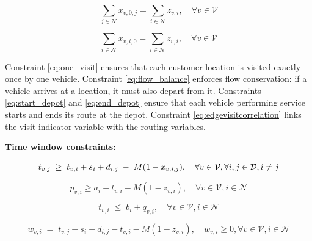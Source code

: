 
\begin{equation}\label{eq:start_depot}
\sum_{j \in \mathcal{N}} x_{v,0,j} = \sum_{i \in \mathcal{N}} z_{v,i}, \quad \forall v \in \mathcal{V}
\end{equation}

\begin{equation}\label{eq:end_depot}
\sum_{i \in \mathcal{N}} x_{v,i,0} = \sum_{i \in \mathcal{N}} z_{v,i}, \quad \forall v \in \mathcal{V}
\end{equation}


Constraint \ref{eq:one_visit} ensures that each customer location is visited exactly once by one vehicle. Constraint \ref{eq:flow_balance} enforces flow conservation: if a vehicle arrives at a location, it must also depart from it. Constraints \eqref{eq:start_depot} and \eqref{eq:end_depot} ensure that each vehicle performing service starts and ends its route at the depot.
Constraint \ref{eq:edgevisitcorrelation} links the visit indicator variable with the routing variables.

\textbf{Time window constraints:}

\scriptsize
\begin{equation}{\label{eq:time_cohestion}}
 t_{v,j} \;\ge\; t_{v,i} + s_i + d_{i,j} \;-\; M(1 - x_{v,i,j}), \quad \forall v \in \mathcal{V}, \forall i,j \in \mathcal{D}, i\neq j
\end{equation}

\begin{equation}\label{eq:start_soft}
p_{v,i} \geq a_i - t_{v,i}-M(1-z_{v,i}), \quad \forall v \in \mathcal{V}, i \in \mathcal{N}
\end{equation}

\begin{equation}\label{eq:penalty}
t_{v,i} \;\le\; b_i + q_{v,i}, \quad \forall v \in \mathcal{V}, i \in \mathcal{N}
\end{equation}

\begin{equation}\label{eq:waiting_time}
w_{v,i} \;=\; t_{v,j}-s_i-d_{i,j}-t_{v,i}-M(1-z_{v,i}), \quad w_{v,i}\ge 0, \forall v \in \mathcal{V}, i \in \mathcal{N}
\end{equation}
\normalsize

